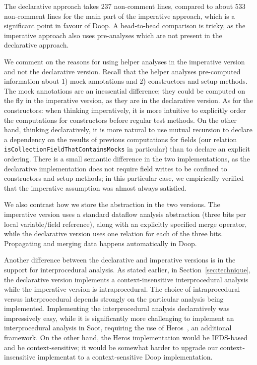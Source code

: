 The declarative approach takes 237 non-comment lines, compared to about 533 non-comment lines for the main part of the imperative approach, which is a significant point in favour of Doop. A head-to-head comparison is tricky, as the imperative approach also uses pre-analyses which are not present in the declarative approach.

We comment on the reasons for using helper analyses in the imperative version and not the declarative version. Recall that the helper analyses pre-computed information about 1) mock annotations and 2) constructors and setup methods. The mock annotations are an inessential difference; they could be computed on the fly in the imperative version, as they are in the declarative version. As for the constructors: when thinking imperatively, it is more intuitive to explicitly order the computations for constructors before regular test methods. On the other hand, thinking declaratively, it is more natural to use mutual recursion to declare a dependency on the results of previous computations for fields (our relation \texttt{isCollectionFieldThatContainsMocks} in particular) than to declare an explicit ordering. There is a small semantic difference in the two implementations, as the declarative implementation does not require field writes to be confined to constructors and setup methods; in this particular case, we empirically verified that the imperative assumption was almost always satisfied.

We also contrast how we store the abstraction in the two versions. The imperative version uses a standard dataflow analysis abstraction (three bits per local variable/field reference), along with an explicitly specified merge operator, while the declarative version uses one relation for each of the three bits. Propagating and merging data happens automatically in Doop.

Another difference between the declarative and imperative versions is in the support for interprocedural analysis. As stated earlier, in Section~\ref{sec:technique}, the declarative version implements a context-insensitive interprocedural analysis while the imperative version is intraprocedural. The choice of intraprocedural versus interprocedural depends strongly on the particular analysis being implemented. Implementing the interprocedural analysis declaratively was impressively easy, while it is significantly more challenging to implement an interprocedural analysis in Soot, requiring the use of Heros~\cite{soap12ifds}, an additional framework. On the other hand, the Heros implementation would be IFDS-based and be context-sensitive; it would be somewhat harder to upgrade our context-insensitive implementat to a context-sensitive Doop implementation.

